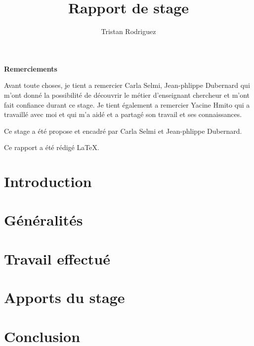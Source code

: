 \documentclass{univ-projet}
\author{Tristan Rodriguez}
\title{Rapport de stage}
\begin{document}
  \maketitle
    \begin{center}
      \textbf{Remerciements}

      Avant toute choses, je tient a remercier Carla Selmi, Jean-phlippe Dubernard qui m'ont donné la possibilité de découvrir le métier d'enseignant chercheur et m'ont fait confiance durant ce stage. Je tient également a remercier Yacine Hmito qui a travaillé avec moi et qui m'a aidé et a partagé son travail et ses connaissances.

      Ce stage a  été propose et encadré par Carla Selmi et Jean-phlippe Dubernard.

      Ce rapport a été rédigé \LaTeX.
    \end{center}

  \clearpage
  
  \tableofcontents
  \clearpage

  \section{Introduction}
  \label{sec:Introduction}
  
  
  \section{Généralités}
  \label{sec:généralités}
  
    
  \section{Travail effectué}
  \label{sec:Travail effectué}
  

  \section{Apports du stage}
  \label{Apports du stage}
  
  
  \section{Conclusion}
  \label{sec:conclusion}
  
  \clearpage

  \nocite{*}
  
  
  
\end{document}
